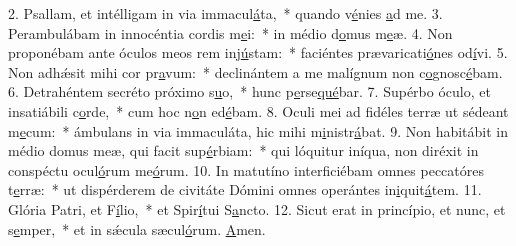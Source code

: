 2. Psallam, et intélligam in via immacul\uline{á}ta,~* quando v\uline{é}nies \uline{a}d me.
3. Perambulábam in innocéntia cordis m\uline{e}i:~* in médio d\uline{o}mus m\uline{e}æ.
4. Non proponébam ante óculos meos rem inj\uline{ú}stam:~* faciéntes prævaricati\uline{ó}nes od\uline{í}vi.
5. Non adhǽsit mihi cor pr\uline{a}vum:~* declinántem a me malígnum non c\uline{o}gnosc\uline{é}bam.
6. Detrahéntem secréto próximo s\uline{u}o,~* hunc p\uline{e}rse\uline{qué}bar.
7. Supérbo óculo, et insatiábili c\uline{o}rde,~* cum hoc n\uline{o}n ed\uline{é}bam.
8. Oculi mei ad fidéles terræ ut sédeant m\uline{e}cum:~* ámbulans in via immaculáta, hic mihi m\uline{i}nistr\uline{á}bat.
9. Non habitábit in médio domus meæ, qui facit sup\uline{é}rbiam:~* qui lóquitur iníqua, non diréxit in conspéctu ocul\uline{ó}rum me\uline{ó}rum.
10. In matutíno interficiébam omnes peccatóres t\uline{e}rræ:~* ut dispérderem de civitáte Dómini omnes operántes in\uline{i}quit\uline{á}tem.
11. Glória Patri, et F\uline{í}lio,~* et Spir\uline{í}tui S\uline{a}ncto.
12. Sicut erat in princípio, et nunc, et s\uline{e}mper,~* et in sǽcula sæcul\uline{ó}rum. \uline{A}men.
